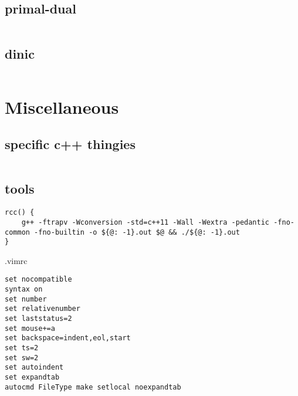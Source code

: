 \documentclass[portrait, 8pt, a4paper, oneside, landscape]{extarticle}
\begin{document}
\subsection{primal-dual}
\inputminted{cpp}{src/primal_dual.cpp}
\subsection{dinic}
\inputminted{cpp}{src/dinic.cpp}

\section{Miscellaneous}
\subsection{specific c++ thingies}
\inputminted{cpp}{src/cpp_utils.cpp}

\subsection{tools}

\begin{verbatim}
rcc() {
    g++ -ftrapv -Wconversion -std=c++11 -Wall -Wextra -pedantic -fno-common -fno-builtin -o ${@: -1}.out $@ && ./${@: -1}.out
}
\end{verbatim}

.vimrc
\begin{verbatim}
set nocompatible
syntax on
set number
set relativenumber
set laststatus=2
set mouse+=a
set backspace=indent,eol,start
set ts=2
set sw=2
set autoindent
set expandtab
autocmd FileType make setlocal noexpandtab
\end{verbatim}

\inputminted{bash}{src/bash_util_cmds.sh}
\end{document}
